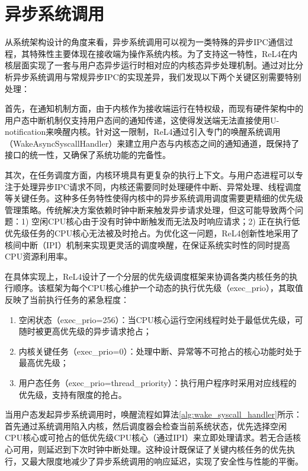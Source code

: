 \section{异步系统调用}

从系统架构设计的角度来看，异步系统调用可以视为一类特殊的异步IPC通信过程，其特殊性主要体现在接收端为操作系统内核。为了支持这一特性，ReL4在内核层面实现了一套与用户态异步运行时相对应的内核态异步处理机制。通过对比分析异步系统调用与常规异步IPC的实现差异，我们发现以下两个关键区别需要特别处理：

首先，在通知机制方面，由于内核作为接收端运行在特权级，而现有硬件架构中的用户态中断机制仅支持用户态间的通知传递，这使得发送端无法直接使用U-notification来唤醒内核。针对这一限制，ReL4通过引入专门的唤醒系统调用（WakeAsyncSyscallHandler）来建立用户态与内核态之间的通知通道，既保持了接口的统一性，又确保了系统功能的完备性。

其次，在任务调度方面，内核环境具有更复杂的执行上下文。与用户态进程可以专注于处理异步IPC请求不同，内核还需要同时处理硬件中断、异常处理、线程调度等关键任务。这种多任务特性使得内核中的异步系统调用调度需要更精细的优先级管理策略。传统解决方案依赖时钟中断来触发异步请求处理，但这可能导致两个问题：1) 空闲CPU核心由于没有时钟中断触发而无法及时响应请求；2) 正在执行低优先级任务的CPU核心无法被及时抢占。为优化这一问题，ReL4创新性地采用了核间中断（IPI）机制来实现更灵活的调度唤醒，在保证系统实时性的同时提高CPU资源利用率。

在具体实现上，ReL4设计了一个分层的优先级调度框架来协调各类内核任务的执行顺序。该框架为每个CPU核心维护一个动态的执行优先级（exec\_prio），其取值反映了当前执行任务的紧急程度：

\begin{enumerate}
    \item 空闲状态（exec\_prio=256）：当CPU核心运行空闲线程时处于最低优先级，可随时被更高优先级的异步请求抢占；
    \item 内核关键任务（exec\_prio=0）：处理中断、异常等不可抢占的核心功能时处于最高优先级；
    \item 用户态任务（exec\_prio=thread\_priority）：执行用户程序时采用对应线程的优先级，支持有限度的抢占。
\end{enumerate}

当用户态发起异步系统调用时，唤醒流程如算法\ref{alg:wake_syscall_handler}所示：首先通过系统调用陷入内核，然后调度器会检查当前系统状态，优先选择空闲CPU核心或可抢占的低优先级CPU核心（通过IPI）来立即处理请求。若无合适核心可用，则延迟到下次时钟中断处理。这种设计既保证了关键内核任务的优先执行，又最大限度地减少了异步系统调用的响应延迟，实现了安全性与性能的平衡。

